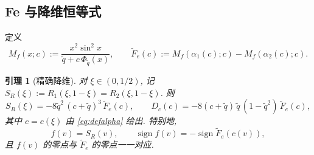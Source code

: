 \documentclass[UTF8]{ctexart}
\newtheorem{lemma}[theorem]{引理}
\begin{document}
\subsection{Fe 与降维恒等式}

定义
\begin{equation}
	M_f(x;c):=\frac{x^2\sin^2x}{\tilde q+c\,\Phi_{\tilde q}(x)},\qquad
	\widetilde F_e(c):=M_f(\alpha_1(c);c)-M_f(\alpha_2(c);c).
	\label{eq:Fe}
\end{equation}

\begin{lemma}[精确降维]\label{lem:dimred}
对 $\xi\in(0,1/2)$, 记 $S_R(\xi):=R_1(\xi,1-\xi)=R_2(\xi,1-\xi)$. 则
\begin{equation}
	S_R(\xi)=-8\tilde q^2\,(c+\tilde q)^3\,\widetilde F_e(c),
	\qquad
	D_c(c)=-8(c+\tilde q)\,\tilde q\,(1-\tilde q^2)\,\widetilde F_e(c),
	\label{eq:dimred}
\end{equation}
其中 $c=c(\xi)$ 由 \eqref{eq:defalpha} 给出. 特别地,
\begin{equation}
	f(v)=S_R(v),\qquad
	\operatorname{sign}f(v)=-\operatorname{sign}\widetilde F_e(c(v)),
\end{equation}
且 $f(v)$ 的零点与 $\widetilde F_e$ 的零点一一对应.
\end{lemma}
\end{document}
